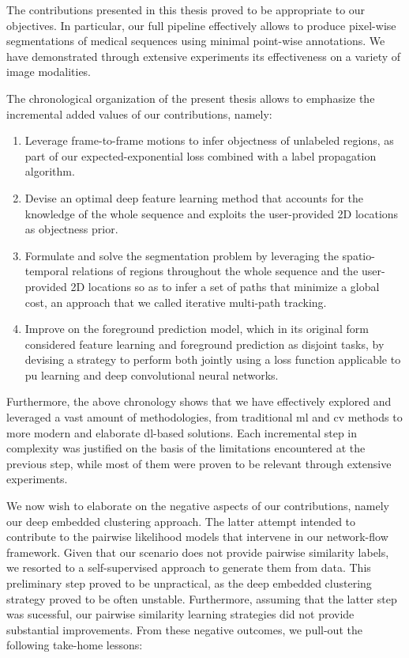 The contributions presented in this thesis proved to be appropriate to our objectives.
In particular, our full pipeline effectively allows to produce pixel-wise segmentations of medical sequences
using minimal point-wise annotations.
We have demonstrated through extensive experiments its effectiveness on a variety of image modalities.

The chronological organization of the present thesis allows to emphasize the incremental added values of our contributions, namely:
\begin{enumerate}
    \item Leverage frame-to-frame motions to infer objectness of unlabeled regions, as part of our expected-exponential loss combined with a label propagation algorithm.
    \item Devise an optimal deep feature learning method that accounts for the knowledge of the whole sequence and exploits the user-provided 2D locations as objectness prior.
    \item Formulate and solve the segmentation problem by leveraging the spatio-temporal relations of regions throughout the whole sequence and the user-provided 2D locations so as to infer a set of paths that minimize a global cost, an approach that we called iterative multi-path tracking.
    \item Improve on the foreground prediction model, which in its original form considered feature learning and foreground prediction as disjoint tasks, by devising a strategy to perform both jointly using a loss function applicable to \gls{pu} learning and deep convolutional neural networks.
\end{enumerate}

Furthermore, the above chronology shows that we have effectively explored and leveraged a vast amount of methodologies, from traditional \gls{ml} and \gls{cv} methods to more modern and elaborate \gls{dl}-based solutions.
Each incremental step in complexity was justified on the basis of the limitations encountered at the previous step, while most of them were proven to be relevant through extensive experiments.

We now wish to elaborate on the negative aspects of our contributions, namely our deep embedded clustering approach.
The latter attempt intended to contribute to the pairwise likelihood models that intervene in our network-flow framework.
Given that our scenario does not provide pairwise similarity labels, we resorted to a self-supervised approach to generate them from data.
This preliminary step proved to be unpractical, as the deep embedded clustering strategy proved to be often unstable.
Furthermore, assuming that the latter step was sucessful, our pairwise similarity learning strategies did not provide substantial improvements.
From these negative outcomes, we pull-out the following take-home lessons:

